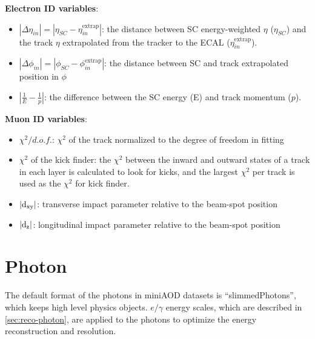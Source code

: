 \documentclass[thesis.tex]{subfiles}
\renewcommand\_{\textunderscore\allowbreak}
\begin{document}
\noindent \textbf{Electron ID variables}:
\begin{itemize}
	\item $|\Delta\eta_{in}| = |\eta_{SC} - \eta_{in}^{\text{extrap}}|$: the distance between SC energy-weighted $\eta$ ($\eta_{SC}$) and the track $\eta$ extrapolated from the tracker to the ECAL ($\eta_{in}^{\text{extrap}}$).
	\item $|\Delta\phi_{in}| = |\phi_{SC} - \phi_{in}^{\text{extrap}}|$: the distance between SC and track extrapolated position in $\phi$
	\item $|\frac{1}{E} - \frac{1}{p}|$: the difference between the SC energy (E) and track momentum ($p$).  
\end{itemize}

\noindent \textbf{Muon ID variables}:
\begin{itemize}
	\item $\chi^2/d.o.f.$: $\chi^2$ of the track normalized to the degree of freedom in fitting 
	\item $\chi^2$ of the kick finder: the $\chi^2$ between the inward and outward states of a track in each layer is calculated to look for kicks, and the largest $\chi^2$ per track is used as the $\chi^2$ for kick finder.
	\item $\mathrm{|d_{xy}|}$: transverse impact parameter relative to the beam-spot position
	\item $\mathrm{|d_{z}|}$: longitudinal impact parameter relative to the beam-spot position 
\end{itemize}


\section{Photon}
\label{sec:photonID}
The default format of the photons in miniAOD datasets is ``slimmedPhotons'', which keeps high level physics objects. 
$e/\gamma$ energy scales, which are described in \ref{sec:reco-photon}, are applied to the photons to optimize the energy reconstruction and resolution. 
\end{document}
